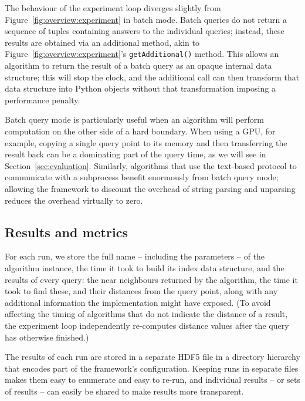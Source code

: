The behaviour of the experiment loop diverges slightly from Figure~\ref{fig:overview:experiment} in batch mode. Batch queries do not return a sequence of tuples containing answers to the individual queries; instead, these results are obtained via an additional method, akin to Figure~\ref{fig:overview:experiment}'s \texttt{getAdditional()} method. This allows an algorithm to return the result of a batch query as an opaque internal data structure; this will stop the clock, and the additional call can then transform that data structure into Python objects without that transformation imposing a performance penalty.

Batch query mode is particularly useful when an algorithm will perform computation on the other side of a hard boundary. When using a GPU, for example, copying a single query point to its memory and then transferring the result back can be a dominating part of the query time, as we will see in Section~\ref{sec:evaluation}.
Similarly, algorithms that use the text-based protocol to communicate with a subprocess benefit enormously from batch query mode; allowing the framework to discount the overhead of string parsing and unparsing reduces the overhead virtually to zero.

\subsection{Results and metrics}


For each run, we store the full name -- including the parameters -- of the
algorithm instance, the time it took to build its index data structure, and the
results of every query: the near neighbours returned by the algorithm, the time
it took to find these, and their distances from the query point, along with any
additional information the implementation might have exposed.
(To avoid affecting the timing of algorithms that do not indicate
the distance of a result, the experiment loop independently re-computes
distance values after the query has otherwise finished.)

The results of each run are stored in a separate HDF5 file in a directory
hierarchy that encodes
part of the framework's configuration. %
Keeping runs in separate files makes them easy to enumerate and easy to re-run,
and individual
results -- or sets of results -- can easily be shared to make results more
transparent.

